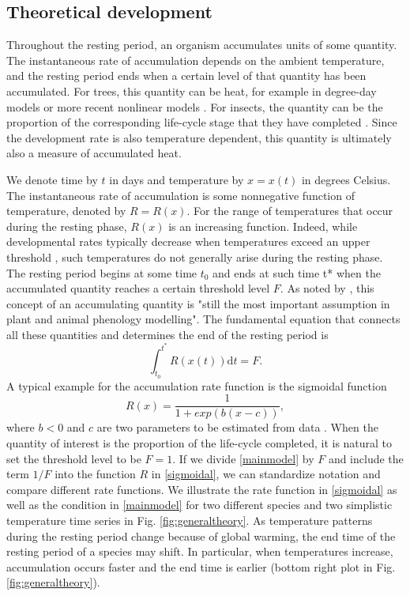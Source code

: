 \documentclass[12 pt]{article}
\begin{document}
\subsection{Theoretical development}
Throughout the resting period, an organism accumulates units of some quantity. The instantaneous rate of accumulation depends on the ambient temperature, and the resting period ends when a certain level of that quantity has been accumulated. For trees, this quantity can be heat, for example in degree-day models \citep{Colombo1998} or more recent nonlinear models \citep{Chuine2000,Desbiens2007}. For insects, the quantity can be the proportion of the corresponding life-cycle stage that they have completed \citep{Cobbold2011,Regniere2012}. Since the development rate is also temperature dependent, this quantity is ultimately also a measure of accumulated heat. \par 
We denote time by $t$ in days and temperature by $x = x(t)$ in degrees Celsius. The instantaneous rate of accumulation is some nonnegative function of temperature, denoted by $R = R(x)$. For the range of temperatures that occur during the resting phase, $R(x)$ is an increasing function. Indeed, while developmental rates typically decrease when temperatures exceed an upper threshold \citep{Deutsch2008,Amarasekare2014}, such temperatures do not generally arise during the resting phase. The resting period begins at some time $t_0$ and ends at such time t* when the accumulated quantity reaches a certain threshold level $F$. As noted by \cite{Chuine2017}, this concept of an accumulating quantity is "still the most important assumption in plant and animal phenology modelling". The fundamental equation that connects all these quantities and determines the end of the resting period is
\begin{equation} \label{mainmodel}
    \int _{t_0} ^{t^*} R(x(t)) \mathrm{d}t = F. \tag{Eq. \theequation}
\end{equation}
A typical example for the accumulation rate function is the sigmoidal function
\begin{equation} \label{sigmoidal}
    R(x)=\frac{1}{1+exp(b(x-c))}, \tag{Eq. \theequation}
\end{equation}
where $b < 0$ and $c$ are two parameters to be estimated from data \citep{Chuine2000,Rebaudo2018}. When the quantity of interest is the proportion of the life-cycle completed, it is natural to set the threshold level to be $F = 1$. If we divide \ref{mainmodel} by $F$ and include the term $1/F$ into the function $R$ in \ref{sigmoidal}, we can standardize notation and compare different rate functions. We illustrate the rate function in \ref{sigmoidal} as well as the condition in \ref{mainmodel} for two different species and two simplistic temperature time series in Fig. \ref{fig:generaltheory}. As temperature patterns during the resting period change because of global warming, the end time of the resting period of a species may shift. In particular, when temperatures increase, accumulation occurs faster and the end time is earlier (bottom right plot in Fig. \ref{fig:generaltheory}). \par
\end{document}
